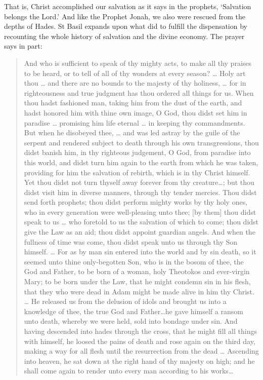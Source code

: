 \documentclass[
]{article}
\begin{document}
That is, Christ accomplished our salvation as it says in the prophets,
`Salvation belongs the Lord.' And like the Prophet Jonah, we also were
rescued from the depths of Hades. St Basil expands upon what did to
fulfill the dispensation by recounting the whole history of salvation
and the divine economy. The prayer says in part:

\begin{quote}
And who is sufficient to speak of thy mighty acts, to make all thy
praises to be heard, or to tell of all of thy wonders at every season?
\ldots{} Holy art thou \ldots{} and there are no bounds to the majesty
of thy holiness, \ldots{} for in righteousness and true judgment has
thou ordered all things for us. When thou hadst fashioned man, taking
him from the dust of the earth, and hadst honored him with thine own
image, O God, thou didst set him in paradise \ldots{} promising him life
eternal \ldots{} in keeping thy commandments. But when he disobeyed
thee, \ldots{} and was led astray by the guile of the serpent and
rendered subject to death through his own transgressions, thou didst
banish him, in thy righteous judgement, O God, from paradise into this
world, and didst turn him again to the earth from which he was taken,
providing for him the salvation of rebirth, which is in thy Christ
himself. Yet thou didst not turn thyself away forever from thy
creature\ldots; but thou didst visit him in diverse manners, through thy
tender mercies. Thou didst send forth prophets; thou didst perform
mighty works by thy holy ones, who in every generation were
well-pleasing unto thee; {[}by them{]} thou didst speak to us \ldots{}
who foretold to us the salvation of which to come; thou didst give the
Law as an aid; thou didst appoint guardian angels. And when the fullness
of time was come, thou didst speak unto us through thy Son himself.
\ldots{} For as by man sin entered into the world and by sin death, so
it seemed unto thine only-begotten Son, who is in the bosom of thee, the
God and Father, to be born of a woman, holy Theotokos and ever-virgin
Mary; to be born under the Law, that he might condemn sin in his flesh,
that they who were dead in Adam might be made alive in him thy Christ.
\ldots{} He released us from the delusion of idols and brought us into a
knowledge of thee, the true God and Father\ldots he gave himself a
ransom unto death, whereby we were held, sold into bondage under sin.
And having descended into hades through the cross, that he might fill
all things with himself, he loosed the pains of death and rose again on
the third day, making a way for all flesh until the resurrection from
the dead \ldots{} Ascending into heaven, he sat down at the right hand
of thy majesty on high; and he shall come again to render unto every man
according to his works\ldots{}
\end{quote}
\end{document}
